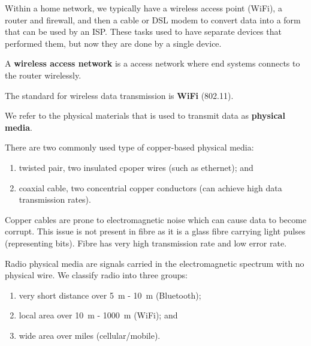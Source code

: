 Within a home network, we typically have a wireless access point (WiFi), a router and firewall, and then a cable or DSL modem to convert data into a form that can be used by an ISP. These tasks used to have separate devices that performed them, but now they are done by a single device.

\begin{definition}
   A \textbf{wireless access network} is a access network where end systems connects to the router wirelessly. 
\end{definition}

The standard for wireless data transmission is \textbf{WiFi} (802.11).

\begin{definition}
   We refer to the physical materials that is used to transmit data as \textbf{physical media}. 
\end{definition}

There are two commonly used type of copper-based physical media:
\begin{enumerate}
    \item twisted pair, two insulated cpoper wires (such as ethernet); and
    \item coaxial cable, two concentrial copper conductors (can achieve high data transmission rates).
\end{enumerate}

Copper cables are prone to electromagnetic noise which can cause data to become corrupt. This issue is not present in fibre as it is a glass fibre carrying light pulses (representing bits). Fibre has very high transmission rate and low error rate.

Radio physical media are signals carried in the electromagnetic spectrum with no physical wire. We classify radio into three groups:
\begin{enumerate}
    \item very short distance over \SI{5}{\metre} - \SI{10}{\metre} (Bluetooth);
    \item local area over \SI{10}{\metre} - \SI{1000}{\metre} (WiFi); and
    \item wide area over miles (cellular/mobile).
\end{enumerate}
